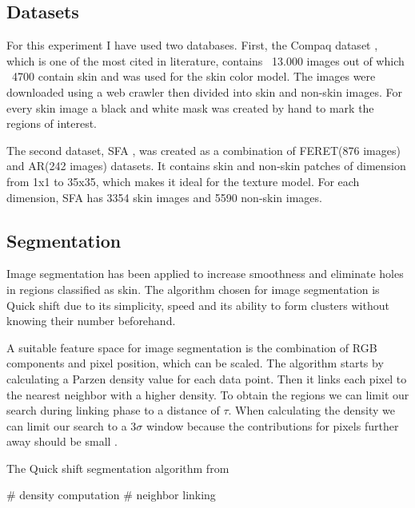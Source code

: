 \documentclass[12pt]{article}
\begin{document}
	\subsection{Datasets}
	For this experiment I have used two databases. First, the Compaq dataset \cite{compaq}, which is one of the most cited in literature, contains ~13.000 images out of which ~4700 contain skin and was used for the skin color model. The images were downloaded using a web crawler then divided into skin and non-skin images. For every skin image a black and white mask was created by hand to mark the regions of interest.
	
	The second dataset, SFA \cite{sfa}, was created as a combination of FERET(876 images) and AR(242 images)  datasets. It contains skin and non-skin patches of dimension from 1x1 to 35x35, which makes it ideal for the texture model. For each dimension, SFA has 3354 skin images and 5590 non-skin images.
	
	\subsection{Segmentation}
	Image segmentation has been applied to increase smoothness and eliminate holes in regions classified as skin. The algorithm chosen for image segmentation is Quick shift due to its simplicity, speed and its ability to form clusters without knowing their number beforehand.
	
	A suitable feature space for image segmentation is the combination of RGB components and pixel position, which can be scaled\cite{quickshift_gpu}. The algorithm starts by calculating a Parzen density value for each data point. Then it links each pixel to the nearest neighbor with a higher density. To obtain the regions we can limit our search during linking phase to a distance of \(\tau\). When calculating the density we can limit our search to a 3$\sigma$ window because the contributions for pixels further away should be small \cite{quickshift_gpu}.
	
	\begin{algorithm}
		\caption{The Quick shift segmentation algorithm from \cite{quickshift_gpu}}
		\label{alg:quick_shift}
		\# density computation\;
		\# neighbor linking\;
	\end{algorithm}
\end{document}
